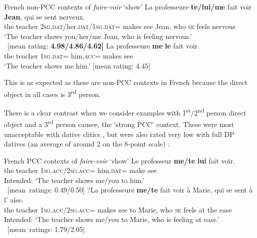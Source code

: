 \documentclass[output=paper,colorlinks,citecolor=brown,nonflat]{langsci/langscibook}
\begin{document}
\ea%
    \label{ex:sheehan:24}
    French non-PCC contexts of \textit{faire-voir} ‘show’
    \ea\label{ex:sheehan:24a}
    \gll    La professeure \textbf{te/lui/me}  fait voir \textbf{Jean},  qui   se   sent   nerveux.\\
            the   teacher   2\textsc{sg}.\textsc{dat}/her.\textsc{dat}/\textsc{1sg}.\textsc{dat}= makes see   Jean,   who \textsc{se}   feels   nervous\\
    \glt    ‘The teacher shows you/her/me Jean, who is feeling nervous.’\\
            ~\hfill  {[mean}  {rating:} \textbf{4.98/4.86/4.62]}
    \ex\label{ex:sheehan:24b}
    \gll    La   professeure   \textbf{me}   \textbf{le}  fait  voir.\\
            the   teacher  \textsc{1sg}.\textsc{dat=} him.\textsc{acc=}  makes  see\\
    \glt     ‘The teacher shows me him.’ \hfill   {[mean}  {rating:}  {4.45]}
    \z
\z

This is as expected as these are non-PCC contexts in French because the direct object in all cases is 3\textsuperscript{rd} person.

There is a clear contrast when we consider examples with 1\textsuperscript{st}/2\textsuperscript{nd} person direct object and a 3\textsuperscript{rd} person causee, the ‘strong PCC’ context. These were most unacceptable with dative clitics , but were also rated very low with full DP datives (an average of around 2 on the 8-point scale) :

\ea%
    \label{ex:sheehan:25}
    French PCC contexts of \textit{faire-voir} ‘show’
    \ea\label{ex:sheehan:25a}
    \gll    *Le professeur  \textbf{me/te}       \textbf{lui}   fait   voir.\\
            the   teacher  \textsc{1sg}.\textsc{acc/}2\textsc{sg}.\textsc{acc}=  him.\textsc{dat}=  make see\\
    \glt    Intended: ‘The teacher shows me/you to him.’\\
            ~\hfill  {[mean~ratings:}  {0.49/0.50]}
    \ex\label{ex:sheehan:25b}
    \gll    *?La   professeure   \textbf{me/te}       fait     voir à   Marie,  qui   se  sent   à   l’  aise. \\
            the     teacher     \textsc{1sg}.\textsc{acc/}2\textsc{sg}.\textsc{acc}= makes   see to Marie, who \textsc{se}   feels   at   the ease\\
    \glt    Intended: ‘The teacher shows me/you to Marie, who is feeling at ease.’
            ~\hfill  {[mean~ratings:}  {1.79/2.05]}
    \z
\z
\end{document}
